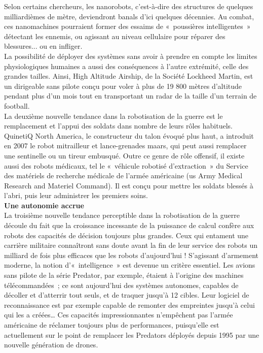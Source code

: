 \documentclass[8pt]{article}
\begin{document}
Selon certains chercheurs, les nanorobots, c’est-à-dire des structures de quelques milliardièmes de mètre, deviendront banals d’ici quelques décennies. Au combat, ces nanomachines pourraient former des essaims de «~poussières intelligentes~» détectant les ennemis, ou agissant au niveau cellulaire pour réparer des blessures... ou en infliger.\\

La possibilité de déployer des systèmes sans avoir à prendre en compte les limites physiologiques humaines a aussi des conséquences à l’autre extrémité, celle des grandes tailles. Ainsi, High Altitude Airship, de la Société Lockheed Martin, est un dirigeable sans pilote conçu pour voler à plus de 19 800 mètres d’altitude pendant plus d’un mois tout en transportant un radar de la taille d’un terrain de football.\\

La deuxième nouvelle tendance dans la robotisation de la guerre est le remplacement et l’appui des soldats dans nombre de leurs rôles habituels. QuinetiQ North America, le constructeur du talon évoqué plus haut, a introduit en 2007 le robot mitrailleur et lance-grenades maars, qui peut aussi remplacer une sentinelle ou un tireur embusqué. Outre ce genre de rôle offensif, il existe aussi des robots médicaux, tel le «~véhicule robotisé d’extraction~» du Service des matériels de recherche médicale de l’armée américaine (us Army Medical Research and Materiel Command). Il est conçu pour mettre les soldats blessés à l’abri, puis leur administrer les premiers soins.\\

\textbf{Une autonomie accrue}\\

La troisième nouvelle tendance perceptible dans la robotisation de la guerre découle du fait que la croissance incessante de la puissance de calcul confère aux robots des capacités de décision toujours plus grandes. Ceux qui entament une carrière militaire connaîtront sans doute avant la fin de leur service des robots un milliard de fois plus efficaces que les robots d’aujourd’hui ! S’agissant d’armement moderne, la notion d’«~intelligence~» est devenue un critère essentiel. Les avions sans pilote de la série Predator, par exemple, étaient à l’origine des machines télécommandées~; ce sont aujourd’hui des systèmes autonomes, capables de décoller et d’atterrir tout seuls, et de traquer jusqu’à 12 cibles. Leur logiciel de reconnaissance est par exemple capable de remonter des empreintes jusqu’à celui qui les a créées… Ces capacités impressionnantes n’empêchent pas l’armée américaine de réclamer toujours plus de performances, puisqu’elle est actuellement sur le point de remplacer les Predators déployés depuis 1995 par une nouvelle génération de drones.\\
\end{document}
